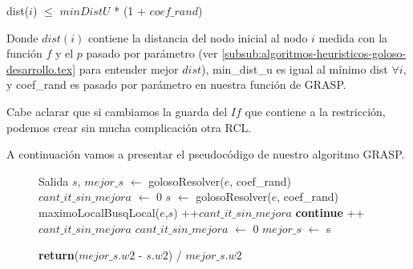 \begin{center}
dist($i$) $\leq$ $minDistU$ * (1 + $coef\_rand$)
\end{center}

Donde $dist(i)$ contiene la distancia del nodo inicial al nodo $i$ medida con la función $f$ y el $p$ pasado por parámetro (ver \ref{subsub:algoritmos-heuristicos-goloso-desarrollo.tex} para entender mejor $dist$), min\_dist\_u es igual al mínimo dist $\forall i$, y coef\_rand es pasado por parámetro en nuestra función de GRASP.

Cabe aclarar que si cambiamos la guarda del $If$ que contiene a la restricción, podemos crear sin mucha complicación otra RCL.

A continuación vamos a presentar el pseudocódigo de nuestro algoritmo GRASP.

\begin{center}
 \begin{figure}[H]
  \begin{pseudo}
    \State Salida $s$, $mejor\_s$ $\leftarrow$ golosoResolver($e$, coef\_rand)
    \State $cant\_it\_sin\_mejora$ $\leftarrow$ 0   
      \State $s$ $\leftarrow$ golosoResolver($e$, coef\_rand)
      \State maximoLocalBusqLocal($e$,$s$)
	\State++$cant\_it\_sin\_mejora$
	\State \textbf{continue}
      \EndIf
	\State ++$cant\_it\_sin\_mejora$
      \Else
	\State $cant\_it\_sin\_mejora$ $\leftarrow$ 0
      \EndIf
	\State $mejor\_s$ $\leftarrow$ s
      \EndIf
    \EndWhile
    \EndProcedure
  \end{pseudo}
 \end{figure}
\end{center}

\begin{center}
 \begin{figure}[H]
  \begin{pseudo}
    \State \textbf{return}($mejor\_s.w2$ - $s.w2$) / $mejor\_s.w2$
  \EndProcedure
  \end{pseudo}
 \end{figure}
\end{center}